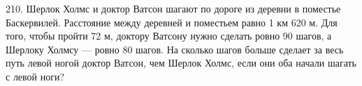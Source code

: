 210. Шерлок Холмс и доктор Ватсон шагают по дороге из деревни в поместье Баскервилей. Расстояние между деревней и поместьем равно 1 км 620 м. Для того, чтобы пройти 72 м, доктору Ватсону нужно сделать ровно 90 шагов, а Шерлоку Холмсу --- ровно 80 шагов. На сколько шагов больше сделает за весь путь левой ногой доктор Ватсон, чем Шерлок Холмс, если они оба начали шагать с левой ноги?\\
